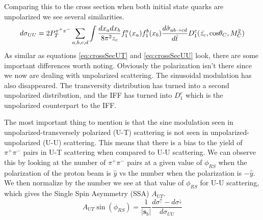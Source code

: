 \documentclass[abstract = on,listof=totoc, bibliography=totoc]{scrreprt}
\newcommand{\phirs}{\phi_{RS}}
\newcommand{\ptpair}{P_{T}^{\pi^+\pi^-}}
\newcommand{\pip}{\pi^+}
\newcommand{\pim}{\pi^-}
\newcommand{\pair}{$\pip\pim$ }
\begin{document}

Comparing this to the cross section when both initial state quarks are unpolarized we see several similarities.
\begin{equation}
\label{eq:crossSecUU}
d\sigma_{UU} = 2 \ptpair \sum_{a,b,c,d} \int \frac{dx_adx_b}{8\pi^2z_c} f_1^a(x_a)f_1^b(x_b) \frac{d\hat{\sigma}_{ab \rightarrow cd}}{d\hat{t}}D_1^c(\bar{z_c},\textnormal{cos}\theta_C,M_C^2)
\end{equation}
As similar as equations \ref{eq:crossSecUT} and \ref{eq:crossSecUU} look, there are some important differences worth noting. Obviously the polarization isn't there since we now are dealing with unpolarized scattering. The sinusoidal modulation has also disappeared. The transversity distribution has turned into a second unpolarized distribution, and the IFF has turned into $D_1^c$ which is the unpolarized counterpart to the IFF.   

The most important thing to mention is that the sine modulation seen in unpolarized-transversely polarized (U-T) scattering is not seen in unpolarized-unpolarized (U-U) scattering. This means that there is a bias to the yield of \pair pairs in U-T scattering when compared to U-U scattering. We can observe this by looking at the number of \pair pairs at a given value of $\phirs$ when the polarization of the proton beam is $\hat{y}$ vs the number when the polarization is $-\hat{y}$. We then normalize by the number we see at that value of $\phirs$ for U-U scattering, which gives the Single Spin Asymmetry (SSA) $A_{UT}$.
\begin{equation}
\label{eq:asymCS}
A_{UT} \sin (\phirs) =\frac{1}{|\bm{s}_b|} \frac{d\sigma^\uparrow - d\sigma^\downarrow}{d\sigma_{UU}}
\end{equation}
\end{document}
